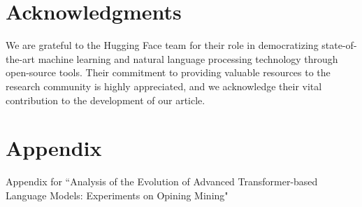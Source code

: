 \documentclass{article}
\begin{document}
\section*{Acknowledgments}
We are grateful to the Hugging Face team for their role in democratizing state-of-the-art machine learning and natural language processing technology through open-source tools. Their commitment to providing valuable resources to the research community is highly appreciated, and we acknowledge their vital contribution to the development of our article.

\section*{Appendix}
Appendix for ``Analysis of the Evolution of Advanced Transformer-based Language Models: Experiments on Opining Mining"

\setcounter{table}{0}
\renewcommand{\thetable}{A\arabic{table}}
\end{document}
